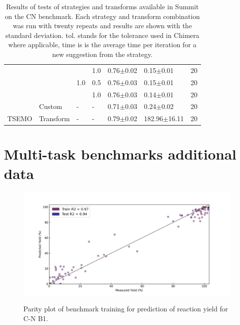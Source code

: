 \begin{table}[]
\begin{tabular}{lllllll}
              &           &     & 1.0 &        0.76$\pm$0.02 &      0.15$\pm$0.01 &       20 \\
              &           & 1.0 & 0.5 &        0.76$\pm$0.03 &      0.15$\pm$0.01 &       20 \\
              &           &     & 1.0 &        0.76$\pm$0.03 &      0.14$\pm$0.01 &       20 \\
              & Custom & - & - &        0.71$\pm$0.03 &      0.24$\pm$0.02 &       20 \\
        TSEMO & Transform & - & - &        0.79$\pm$0.02 &   182.96$\pm$16.11 &       20 \\
    \end{tabular}
    \caption{Results of tests of strategies and transforms available in Summit on the CN benchmark. Each strategy and transform combination was run with twenty repeats and results are shown with the standard deviation. tol. stands for the tolerance used in Chimera where applicable, time is is the average time per iteration for a new suggestion from the strategy.}
    \label{tab:cn_benchmark}
\end{table}

\section{Multi-task benchmarks additional data}

\begin{figure}
\caption{Parity plot of benchmark training for prediction of reaction yield for C-N B1.}\includegraphics[width=1\textwidth]{gfx/Appendix/baumgartner_cn_case_1_parity_plot.png}
\label{fig:1}
\end{figure}

